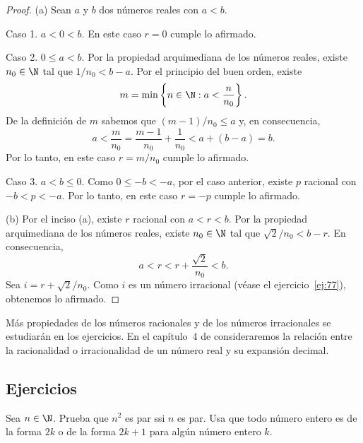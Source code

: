 \documentclass[12pt,a4paper]{book}
\begin{document}
    \begin{proof}
        (a) Sean $a$ y $b$ dos números reales con $a<b$.

        Caso 1. $a<0<b$. En este caso $r=0$ cumple lo afirmado.

        Caso 2. $0\leq a<b$. Por la propiedad arquimediana de los números reales,
        existe $n_{0}\in\N$ tal que $1/n_{0}<b-a$. Por el principio del buen orden, existe
        \begin{equation*}
            m=\min\left\{n\in\N:a<\frac{n}{n_{0}}\right\}.
        \end{equation*}
        De la definición de $m$ sabemos que $(m-1)/n_{0}\leq a$ y, en consecuencia,
        \begin{equation*}
            a<\frac{m}{n_{0}}=\frac{m-1}{n_{0}}+\frac{1}{n_{0}}<a+(b-a)=b.
        \end{equation*}
        Por lo tanto, en este caso $r=m/n_{0}$ cumple lo afirmado.

        Caso 3. $a<b\leq 0$. Como $0\leq -b<-a$, por el caso anterior, existe $p$
        racional con $-b<p<-a$. Por lo tanto, en este caso $r=-p$ cumple lo
        afirmado.

        (b) Por el inciso (a), existe $r$ racional con $a<r<b$. Por la propiedad
        arquimediana de los números reales, existe $n_{0}\in\N$ tal que $\sqrt{2}/n_{0}<b-r$. En
        consecuencia,
        \begin{equation*}
            a<r<r+\frac{\sqrt{2}}{n_{0}}<b.
        \end{equation*}
        Sea $i=r+\sqrt{2}/n_{0}$. Como $i$ es un número irracional (véase el ejercicio~\ref{ej:77}),
        obtenemos lo afirmado.
    \end{proof}

    Más propiedades de los números racionales y de los números irracionales
    se estudiarán en los ejercicios. En el capítulo~4 de \cite{nunez2020calculoII} consideraremos la relación
    entre la racionalidad o irracionalidad de un número real y su expansión
    decimal.

    \par{}\subsection*{Ejercicios}

    \begin{ejercicio}\label{ej:74}
        Sea $n\in\N$. Prueba que $n^{2}$ es par ssi $n$ es par. \sugerencia
        Usa que todo número entero es de la forma $2k$ o de la forma $2k+1$ para
        algún número entero $k$.
    \end{ejercicio}
\end{document}
